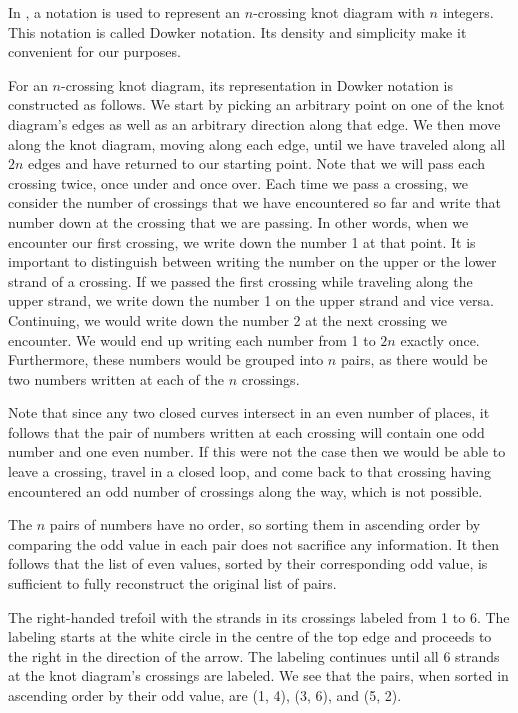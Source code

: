 \begin{paper}
In \cite{htw}, a notation is used to represent an $n$-crossing knot diagram with
$n$ integers.
This notation is called Dowker notation.
Its density and simplicity make it convenient for our purposes.

For an $n$-crossing knot diagram, its representation in Dowker notation is
constructed as follows.
We start by picking an arbitrary point on one of the knot diagram's edges as
well as an arbitrary direction along that edge.
We then move along the knot diagram, moving along each edge, until we have
traveled along all $2n$ edges and have returned to our starting point.
Note that we will pass each crossing twice, once under and once over.
Each time we pass a crossing, we consider the number of crossings that we
have encountered so far and write that number down at the crossing that we are
passing.
In other words, when we encounter our first crossing, we write down the number 1
at that point.
It is important to distinguish between writing the number on the upper or the
lower strand of a crossing.
If we passed the first crossing while traveling along the upper strand, we write
down the number 1 on the upper strand and vice versa.
Continuing, we would write down the number 2 at the next crossing we encounter.
We would end up writing each number from 1 to $2n$ exactly once.
Furthermore, these numbers would be grouped into $n$ pairs, as there would be
two numbers written at each of the $n$ crossings.

Note that since any two closed curves intersect in an even number of places, it
follows that the pair of numbers written at each crossing will contain one odd
number and one even number.
If this were not the case then we would be able to leave a crossing, travel in a
closed loop, and come back to that crossing having encountered an odd number of
crossings along the way, which is not possible.

The $n$ pairs of numbers have no order, so sorting them in ascending order by
comparing the odd value in each pair does not sacrifice any information.
It then follows that the list of even values, sorted by their corresponding odd
value, is sufficient to fully reconstruct the original list of pairs.\\

{\begin{center}\end{center}}
{The right-handed trefoil with the strands in its crossings labeled from 1 to 6.
The labeling starts at the white circle in the centre of the top edge and
proceeds to the right in the direction of the arrow.
The labeling continues until all 6 strands at the knot diagram's crossings are
labeled.
We see that the pairs, when sorted in ascending order by their odd value, are
(1, 4), (3, 6), and (5, 2).\\}\\


\end{paper}
